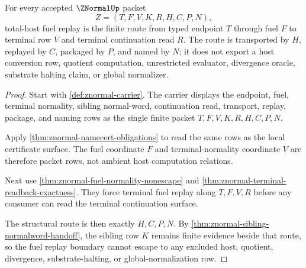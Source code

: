 \begin{theorem}
\label{thm:znormal-total-host-fuel-replay-boundary}
For every accepted $\ZNormalUp$ packet
$$
Z=(T,F,V,K,R,H,C,P,N),
$$
total-host fuel replay is the finite route from typed endpoint $T$ through
fuel $F$ to terminal row $V$ and terminal continuation read $R$. The route is
transported by $H$, replayed by $C$, packaged by $P$, and named by $N$; it
does not export a host conversion row, quotient computation, unrestricted
evaluator, divergence oracle, substrate halting claim, or global normalizer.
\end{theorem}
\begin{proof}
Start with \autoref{def:znormal-carrier}. The carrier displays the endpoint,
fuel, terminal normality, sibling normal-word, continuation read, transport,
replay, package, and naming rows as the single finite packet
$T,F,V,K,R,H,C,P,N$.

Apply \autoref{thm:znormal-namecert-obligations} to read the same rows as the
local certificate surface. The fuel coordinate $F$ and terminal-normality
coordinate $V$ are therefore packet rows, not ambient host computation
relations.

Next use \autoref{thm:znormal-fuel-normality-nonescape} and
\autoref{thm:znormal-terminal-readback-exactness}. They force terminal fuel
replay along $T,F,V,R$ before any consumer can read the terminal continuation
surface.

The structural route is then exactly $H,C,P,N$. By
\autoref{thm:znormal-sibling-normalword-handoff}, the sibling row $K$ remains
finite evidence beside that route, so the fuel replay boundary cannot escape
to any excluded host, quotient, divergence, substrate-halting, or
global-normalization row.
\end{proof}

